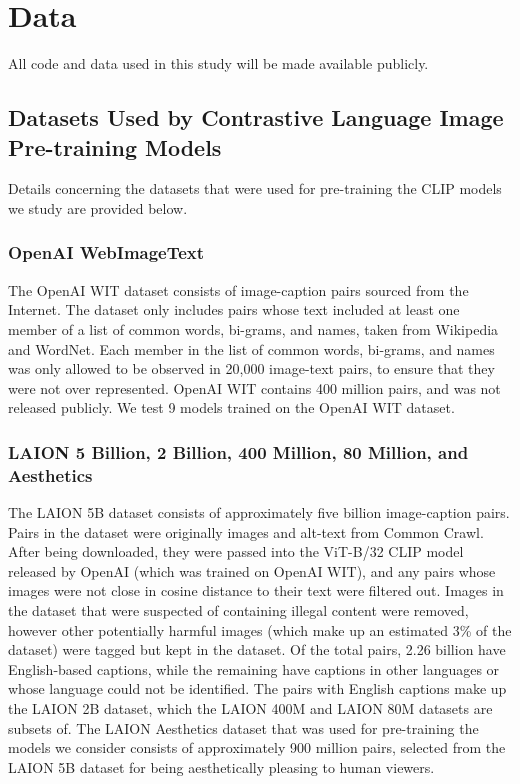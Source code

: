 \appendix

\section{Data}
\label{sec:apd_data}
All code and data used in this study will be made available publicly.

\subsection{Datasets Used by Contrastive Language Image Pre-training Models}


Details concerning the datasets that were used for pre-training the CLIP models we study are provided below.

\subsubsection{OpenAI WebImageText}
The OpenAI WIT dataset \cite{Radford2021LearningSupervision} consists of image-caption pairs sourced from the Internet. The dataset only includes pairs whose text included at least one member of a list of common words, bi-grams, and names, taken from Wikipedia and WordNet. Each member in the list of common words, bi-grams, and names was only allowed to be observed in 20,000 image-text pairs, to ensure that they were not over represented. OpenAI WIT contains 400 million pairs, and was not released publicly. We test 9 models trained on the OpenAI WIT dataset. 

\subsubsection{LAION 5 Billion, 2 Billion, 400 Million, 80 Million, and Aesthetics}
The LAION 5B dataset \cite{Schuhmann2022LAION-5B:Models} consists of approximately five billion image-caption pairs. Pairs in the dataset were originally images and alt-text from Common Crawl. After being downloaded, they were passed into the ViT-B/32 CLIP model released by OpenAI (which was trained on OpenAI WIT), and any pairs whose images were not close in cosine distance to their text were filtered out. Images in the dataset that were suspected of containing illegal content were removed, however other potentially harmful images (which make up an estimated 3\% of the dataset) were tagged but kept in the dataset. Of the total pairs, 2.26 billion have English-based captions, while the remaining have captions in other languages or whose language could not be identified. The pairs with English captions make up the LAION 2B dataset, which the LAION 400M and LAION 80M datasets are subsets of. The LAION Aesthetics dataset that was used for pre-training the models we consider consists of approximately 900 million pairs, selected from the LAION 5B dataset for being aesthetically pleasing to human viewers.

